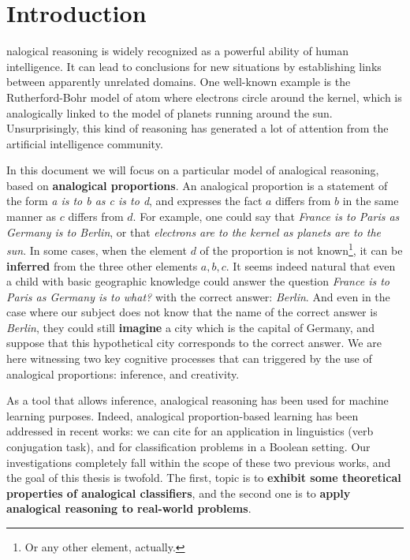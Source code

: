 \chapter*{Introduction}
nalogical reasoning is widely recognized as a powerful ability of
human intelligence.  It can lead to conclusions for new situations by
establishing links between apparently unrelated domains. One well-known example
is the Rutherford-Bohr model of atom where electrons circle around the kernel,
which is analogically linked to the model of planets running around the sun.
Unsurprisingly, this kind of reasoning has generated a lot of attention from
the artificial intelligence community.

In this document we will focus on a particular model of analogical reasoning,
based on \textbf{analogical proportions}. An analogical proportion is a
statement of the form \textit{a is to b as c is to d}, and expresses the fact
$a$ differs from $b$ in the same manner as $c$ differs from $d$. For example,
one could say that \textit{France is to Paris as Germany is to Berlin}, or that
\textit{electrons are to the kernel as planets are to the sun}. In some cases,
when the element $d$ of the proportion is not known\footnote{Or any other
element, actually.}, it can be \textbf{inferred} from the three other elements
$a, b, c$. It seems indeed natural that even a child with basic geographic
knowledge could answer the question \textit{France is to Paris as Germany is to
what?} with the correct answer: \textit{Berlin}. And even in the case where our
subject does not know that the name of the correct answer is \textit{Berlin},
they could still \textbf{imagine} a city  which is the capital of Germany, and
suppose that this hypothetical city corresponds to the correct answer. We are
here witnessing two key cognitive processes that can triggered by the use
of analogical proportions: inference, and creativity.

As a tool that allows inference, analogical reasoning has been used for machine
learning purposes. Indeed, analogical proportion-based learning has been
addressed in recent works: we can cite \cite{StrYvoCNLL05} for an application
in linguistics (verb conjugation task), and \cite{BayMicDelIJCAI07} for
classification problems in a Boolean setting. Our investigations completely
fall within the scope of these two previous works, and the goal of this thesis
is twofold. The first, topic is to \textbf{exhibit some theoretical properties
of analogical classifiers}, and the second one is to \textbf{apply analogical
reasoning to real-world problems}.

